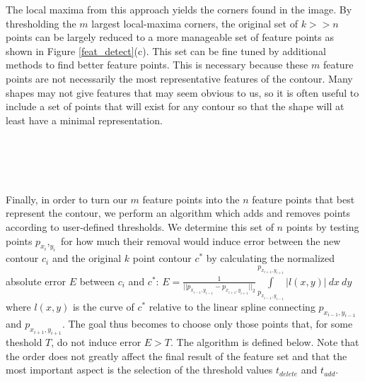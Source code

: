 \documentclass[paper=a4, fontsize=11pt]{scrartcl} %
\begin{document}
The local maxima from this approach yields the corners found in the image. By thresholding the $m$ largest local-maxima corners, the original set of $k >> n$ points can be largely reduced to a more manageable set of feature points as shown in Figure \ref{feat_detect}(c). This set can be fine tuned by additional methods to find better feature points. This is necessary because these $m$ feature points are not necessarily the most representative features of the contour. Many shapes may not give features that may seem obvious to us, so it is often useful to include a set of points that will exist for any contour so that the shape will at least have a minimal representation.  

\\
\\
\\
\\
Finally, in order to turn our $m$ feature points into the $n$ feature points that best represent the contour, we perform an algorithm which adds and removes points according to user-defined thresholds. We determine this set of $n$ points by testing points $p_{x_i},_{y_i}$ for how much their removal would induce error between the new contour $c_i$ and the original $k$ point contour $c^*$ by calculating the normalized absolute error $E$ between $c_i$ and $c^*$: $E = \frac{1}{|| p_{x_{i-1},y_{i-1}}  -  p_{x_{i+1},y_{i+1}} ||_2} \int\limits_{p_{x_{i-1},y_{i-1}}}^{p_{x_{i+1},y_{i+1}}} |l(x,y)| \ dx \ dy$ where $l(x,y)$ is the curve of $c^*$ relative to the linear spline connecting $p_{x_{i-1},y_{i-1}}$ and $p_{x_{i+1},y_{i+1}}$. The goal thus becomes to choose only those points that, for some theshold $T$, do not induce error $E > T$. The algorithm is defined below. Note that the order does not greatly affect the final result of the feature set and that the most important aspect is the selection of the threshold values $t_{delete}$ and $t_{add}$. 
\end{document}
